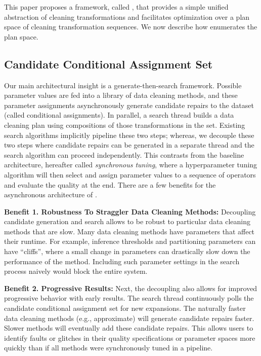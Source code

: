 This paper proposes a framework, called \sys, that provides a simple unified abstraction of cleaning transformations and facilitates optimization over a plan space of cleaning transformation sequences.
We now describe how \sys enumerates the plan space.

\subsection{Candidate Conditional Assignment Set}
Our main architectural insight is a generate-then-search framework.
Possible parameter values are fed into a library of data cleaning methods, and these parameter assignments asynchronously generate candidate repairs to the dataset (called conditional assignments).
In parallel, a search thread builds a data cleaning plan using compositions of those transformations in the set. 
Existing search algorithms implicitly pipeline these two steps; whereas, we decouple these two steps where candidate repairs can be generated in a separate thread and the search algorithm can proceed independently.
This contrasts from the baseline architecture, hereafter called \emph{synchronous tuning}, where a hyperparameter tuning algorithm will then select and assign parameter values to a sequence of operators and evaluate the quality at the end. 
There are a few benefits for the asynchronous architecture of \sys.

\vspace{0.5em} \noindent \textbf{Benefit 1. Robustness To Straggler Data Cleaning Methods: } Decoupling candidate generation and search allows \sys to be robust to particular data cleaning methods that are slow. Many data cleaning methods have parameters that affect their runtime. For example, inference thresholds and partitioning parameters can have ``cliffs'', where a small change in parameters can drastically slow down the performance of the method. Including such parameter settings in the search process naively would block the entire system.

\vspace{0.5em} \noindent \textbf{Benefit 2. Progressive Results: } Next, the decoupling also allows for improved progressive behavior with early results. The search thread continuously polls the candidate conditional assignment set for new expansions. The naturally faster  data cleaning methods (e.g., approximate) will generate candidate repairs faster. Slower methods will eventually add these candidate repairs. This allows users to identify faults or glitches in their quality specifications or parameter spaces more quickly than if all methods were synchronously tuned in a pipeline.

